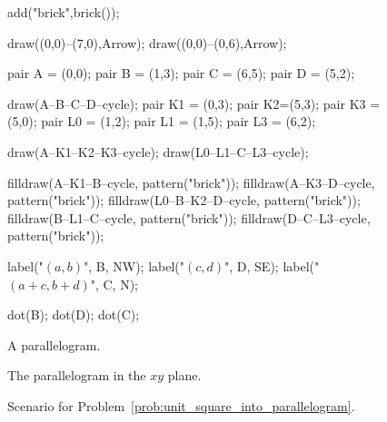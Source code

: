 \documentclass[../gatm.tex]{subfiles}
\begin{document}
\begin{figure}[h]
\begin{center}
\begin{minipage}[b]{0.3\textwidth}
\begin{asy}[width=0.9\textwidth]
				add("brick",brick());
				
				draw((0,0)--(7,0),Arrow);
				draw((0,0)--(0,6),Arrow);
				
				pair A = (0,0);
				pair B = (1,3);
				pair C = (6,5);
				pair D = (5,2);
				
				draw(A--B--C--D--cycle);
				pair K1 = (0,3);
				pair K2=(5,3);
				pair K3 = (5,0);
				pair L0 = (1,2);
				pair L1 = (1,5);
				pair L3 = (6,2);
				
				draw(A--K1--K2--K3--cycle);
				draw(L0--L1--C--L3--cycle);
				
				filldraw(A--K1--B--cycle, pattern("brick"));
				filldraw(A--K3--D--cycle, pattern("brick"));
				filldraw(L0--B--K2--D--cycle, pattern("brick"));
				filldraw(B--L1--C--cycle, pattern("brick"));
				filldraw(D--C--L3--cycle, pattern("brick"));
				
				label("$(a,b)$", B, NW);
				label("$(c,d)$", D, SE);
				label("$(a+c,b+d)$", C, N);
				
				dot(B);
				dot(D);
				dot(C);
			
			\end{asy}
		\end{minipage}
	\end{center}
	\vspace*{-2\baselineskip}
	\begin{center}
		\begin{minipage}[t]{0.3\textwidth}
			\caption{A parallelogram.}
			\label{fig:parallelogram_generic}
		\end{minipage}
		\hfill
		\begin{minipage}[t]{0.3\textwidth}
			\caption{The parallelogram in the $xy$ plane.}
			\label{fig:para_in_xy}
		\end{minipage}
		\hfill
		\begin{minipage}[t]{0.3\textwidth}
			\caption{Scenario for Problem~\ref{prob:unit_square_into_parallelogram}.}
			\label{fig:para_scenario}
		\end{minipage}
	\end{center}
\end{figure}
\end{document}
